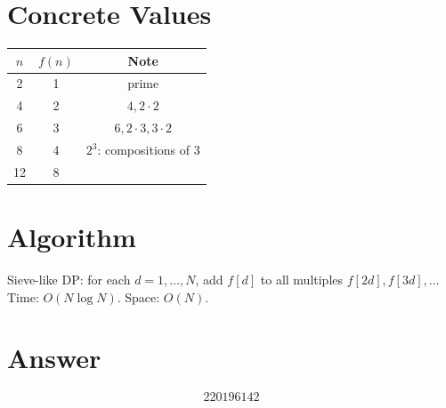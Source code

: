 \documentclass[11pt]{article}
\begin{document}
\section{Concrete Values}

\begin{center}
\begin{tabular}{ccc}
\toprule
$n$ & $f(n)$ & Note \\
\midrule
2  & 1 & prime \\
4  & 2 & $4, 2\cdot2$ \\
6  & 3 & $6, 2\cdot3, 3\cdot2$ \\
8  & 4 & $2^3$: compositions of 3 \\
12 & 8 & \\
\bottomrule
\end{tabular}
\end{center}

\section{Algorithm}

Sieve-like DP: for each $d = 1, \ldots, N$, add $f[d]$ to all multiples $f[2d], f[3d], \ldots$ Time: $O(N\log N)$. Space: $O(N)$.

\section{Answer}

\[
\boxed{220196142}
\]
\end{document}
